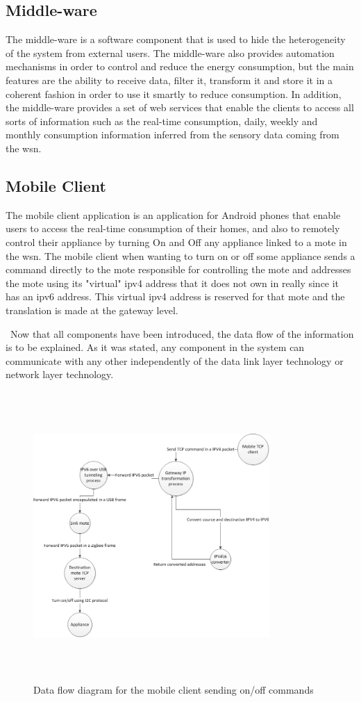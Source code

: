 \documentclass[conference]{IEEEtran}
\begin{document}
\subsection{Middle-ware}
The middle-ware is a software component that is used to hide the heterogeneity of the system from external users. The middle-ware also provides automation mechanisms in order to control and reduce the energy consumption, but the main features are the ability to receive data, filter it, transform it and store it in a coherent fashion in order to use it smartly to reduce consumption. In addition, the middle-ware provides a set of web services that enable the clients to access all sorts of information such as the real-time consumption, daily, weekly and monthly consumption information inferred from the sensory data coming from the \gls{wsn}.

\subsection{Mobile Client}
The mobile client application is an application for Android phones that enable users to access the real-time consumption of their homes, and also to remotely control their appliance by turning On and Off any appliance linked to a mote in the \gls{wsn}. The mobile client when wanting to turn on or off some appliance sends a command directly to the mote responsible for controlling the mote and addresses the mote using its "virtual" \gls{ipv4} address that it does not own in really since it has an \gls{ipv6} address. This virtual \gls{ipv4} address is reserved for that mote and the translation is made at the gateway level.

\ Now that all components have been introduced, the data flow of the information is to be explained. As it was stated, any component in the system can communicate with any other independently of the data link layer technology or network layer technology.

\begin{figure}[htbp]
\centering
\includegraphics[height=110mm,width=90mm]{images/control_appliance_data_flow.jpg}
\caption{Data flow diagram for the mobile client sending on/off commands}
\label{fig:control_appliance}
\end{figure}
\end{document}
